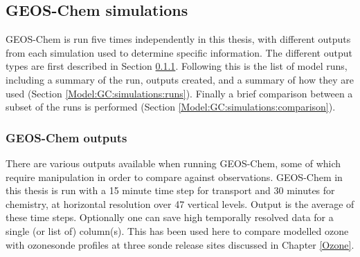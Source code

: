   \subsection{GEOS-Chem simulations}
    \label{Model:GC:simulations}
    
    GEOS-Chem is run five times independently in this thesis, with different outputs from each simulation used to determine specific information. 
    The different output types are first described in Section \ref{Model:GC:simulations:outputs}.
    Following this is the list of model runs, including a summary of the run, outputs created, and a summary of how they are used (Section \ref{Model:GC:simulations:runs}).
    Finally a brief comparison between a subset of the runs is performed (Section \ref{Model:GC:simulations:comparison}).
    
    \subsubsection{GEOS-Chem outputs}
      \label{Model:GC:simulations:outputs}
      There are various outputs available when running GEOS-Chem, some of which require manipulation in order to compare against observations.
      GEOS-Chem in this thesis is run with a 15 minute time step for transport and 30 minutes for chemistry, at \lowhr horizontal resolution over 47 vertical levels.
      Output is the average of these time steps.
      Optionally one can save high temporally resolved data for a single (or list of) column(s).
      This has been used here to compare modelled ozone with ozonesonde profiles at three sonde release sites discussed in Chapter \ref{Ozone}.
      

